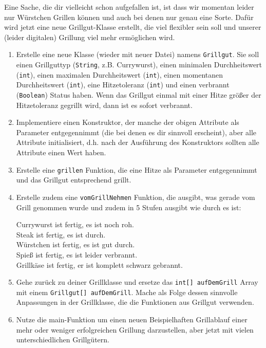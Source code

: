 \documentclass{../../sheet}
\begin{document}
\newpage
{}
Eine Sache, die dir vielleicht schon aufgefallen ist, ist dass wir momentan leider nur Würstchen Grillen können und auch bei denen nur genau eine Sorte. Dafür wird jetzt eine neue Grillgut-Klasse erstellt, die viel flexibler sein soll und unserer (leider digitalen) Grillung viel mehr ermöglichen wird.
\begin{enumerate}
    \item Erstelle eine neue Klasse (wieder mit neuer Datei) namens \texttt{Grillgut}. Sie soll einen Grillguttyp (\texttt{String}, z.B. Currywurst), einen minimalen Durchheitswert (\texttt{int}), einen maximalen Durchheitswert (\texttt{int}), einen momentanen Durchheitswert (\texttt{int}), eine Hitzetoleranz (\texttt{int}) und einen verbrannt (\texttt{Boolean}) Status haben. Wenn das Grillgut einmal mit einer Hitze größer der Hitzetoleranz gegrillt wird, dann ist es sofort verbrannt.
    \item Implementiere einen Konstruktor, der manche der obigen Attribute als Parameter entgegennimmt (die bei denen es dir sinnvoll erscheint), aber alle Attribute initialisiert, d.h. nach der Ausführung des Konstruktors sollten alle Attribute einen Wert haben.
    \item Erstelle eine \texttt{grillen} Funktion, die eine Hitze als Parameter entgegennimmt und das Grillgut entsprechend grillt. 
    \item Erstelle zudem eine \texttt{vomGrillNehmen} Funktion, die ausgibt, was gerade vom Grill genommen wurde und zudem in 5 Stufen ausgibt wie durch es ist:
    \begin{ausgabe}
Currywurst ist fertig, es ist noch roh.\\
Steak ist fertig, es ist durch.\\
Würstchen ist fertig, es ist gut durch.\\
Spieß ist fertig, es ist leider verbrannt.\\
Grillkäse ist fertig, er ist komplett schwarz gebrannt.
    \end{ausgabe}
    \item Gehe zurück zu deiner Grillklasse und ersetze das \texttt{int[] aufDemGrill} Array mit einem \texttt{Grillgut[] aufDemGrill}. Mache als Folge dessen sinnvolle Anpassungen in der Grillklasse, die die Funktionen aus Grillgut verwenden.
    \item Nutze die main-Funktion um einen neuen Beispielhaften Grillablauf einer mehr oder weniger erfolgreichen
    Grillung darzustellen, aber jetzt mit vielen unterschiedlichen Grillgütern.
\end{enumerate}
\end{document}
